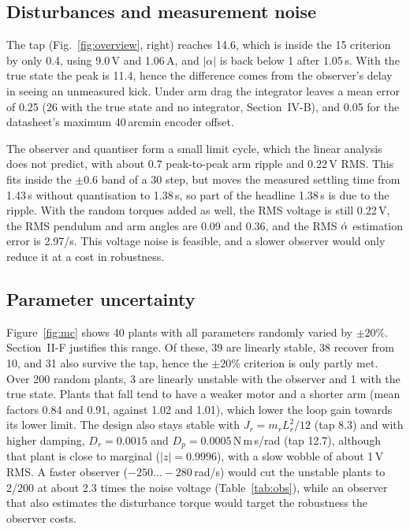\subsection{Disturbances and measurement noise}
\begin{rw}
The tap (Fig.~\ref{fig:overview}, right) reaches 14.6\textdegree, which is inside the 15\textdegree{} criterion by only 0.4\textdegree, using 9.0\,V and 1.06\,A, and $|\alpha|$ is back below 1\textdegree{} after 1.05\,s. With the true state the peak is 11.4\textdegree, hence the difference comes from the observer's delay in seeing an unmeasured kick. Under arm drag the integrator leaves a mean error of 0.25\textdegree{} (26\textdegree{} with the true state and no integrator, Section~IV-B), and 0.05\textdegree{} for the datasheet's maximum 40\,arcmin encoder offset.

The observer and quantiser form a small limit cycle, which the linear analysis does not predict, with about 0.7\textdegree{} peak-to-peak arm ripple and 0.22\,V RMS. This fits inside the $\pm0.6$\textdegree{} band of a 30\textdegree{} step, but moves the measured settling time from 1.43\,s without quantisation to 1.38\,s, so part of the headline 1.38\,s is due to the ripple. With the random torques added as well, the RMS voltage is still 0.22\,V, the RMS pendulum and arm angles are 0.09\textdegree{} and 0.36\textdegree, and the RMS $\dot\alpha$ estimation error is 2.97\textdegree/s. This voltage noise is feasible, and a slower observer would only reduce it at a cost in robustness.
\end{rw}

\subsection{Parameter uncertainty}
\begin{rw}
Figure~\ref{fig:mc} shows 40 plants with all parameters randomly varied by $\pm20$\%. Section~II-F justifies this range. Of these, 39 are linearly stable, 38 recover from 10\textdegree{}, and 31 also survive the tap, hence the $\pm20$\% criterion is only partly met. Over 200 random plants, 3 are linearly unstable with the observer and 1 with the true state. Plants that fall tend to have a weaker motor and a shorter arm (mean factors 0.84 and 0.91, against 1.02 and 1.01), which lower the loop gain towards its lower limit. The design also stays stable with $J_r=m_rL_r^2/12$ \cite{xu2023} (tap 8.3\textdegree) and with higher damping, $D_r=0.0015$ and $D_p=0.0005$\,N\,m\,s/rad (tap 12.7\textdegree), although that plant is close to marginal ($|z|=0.9996$), with a slow wobble of about 1\,V RMS. A faster observer ($-250\ldots-280$\,rad/s) would cut the unstable plants to 2/200 at about 2.3 times the noise voltage (Table~\ref{tab:obs}), while an observer that also estimates the disturbance torque would target the robustness the observer costs.
\end{rw}

